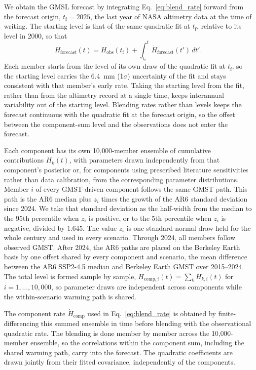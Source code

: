 \documentclass[draft,linenumbers]{agujournal2025}
\begin{document}
We obtain the GMSL forecast by integrating Eq.~\ref{eq:blend_rate} forward from the forecast origin, $t_{\mathrm{f}} = 2025$, the last year of NASA altimetry data at the time of writing. The starting level is that of the same quadratic fit at $t_{\mathrm{f}}$, relative to its level in 2000, so that 
\begin{equation}
	H_{\mathrm{forecast}}(t) = H_{\mathrm{obs}}(t_{\mathrm{f}}) + \int_{t_{\mathrm{f}}}^{t} \dot{H}_{\mathrm{forecast}}(t')\,dt'.
	\label{eq:blend_level}
\end{equation}
Each member starts from the level of its own draw of the quadratic fit at $t_{\mathrm{f}}$, so the starting level carries the 6.4~mm (1$\sigma$) uncertainty of the fit and stays consistent with that member's early rate. Taking the starting level from the fit, rather than from the altimetry record at a single time, keeps interannual variability out of the starting level. Blending rates rather than levels keeps the forecast continuous with the quadratic fit at the forecast origin, so the offset between the component-sum level and the observations does not enter the forecast. 

Each component has its own 10,000-member ensemble of cumulative contributions $H_k(t)$, with parameters drawn independently from that component's posterior or, for components using prescribed literature sensitivities rather than data calibration, from the corresponding parameter distributions. Member $i$ of every GMST-driven component follows the same GMST path. This path is the AR6 median plus $z_i$ times the growth of the AR6 standard deviation since 2024. We take that standard deviation as the half-width from the median to the 95th percentile when $z_i$ is positive, or to the 5th percentile when $z_i$ is negative, divided by 1.645. The value $z_i$ is one standard-normal draw held for the whole century and used in every scenario. Through 2024, all members follow observed GMST. After 2024, the AR6 paths are placed on the Berkeley Earth basis by one offset shared by every component and scenario, the mean difference between the AR6 SSP2-4.5 median and Berkeley Earth GMST over 2015--2024. The total level is formed sample by sample, $H_{\mathrm{comp},i}(t)=\sum_k H_{k,i}(t)$ for $i=1,\dots,10{,}000$, so parameter draws are independent across components while the within-scenario warming path is shared. 

The component rate $\dot{H}_{\mathrm{comp}}$ used in Eq.~\ref{eq:blend_rate} is obtained by finite-differencing this summed ensemble in time before blending with the observational quadratic rate. The blending is done member by member across the 10,000-member ensemble, so the correlations within the component sum, including the shared warming path, carry into the forecast. The quadratic coefficients are drawn jointly from their fitted covariance, independently of the components. 
\end{document}
